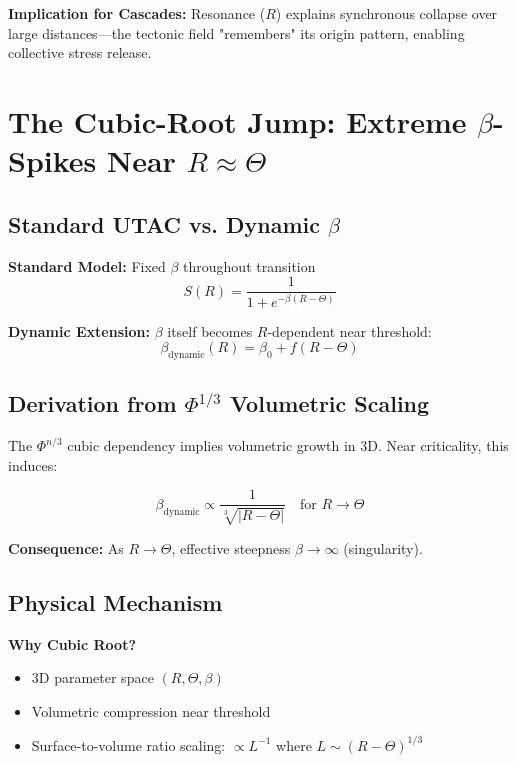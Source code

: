 \documentclass[11pt,a4paper]{article}
\begin{document}
\textbf{Implication for Cascades:} Resonance ($R$) explains synchronous collapse over large distances—the tectonic field "remembers" its origin pattern, enabling collective stress release.

\section{The Cubic-Root Jump: Extreme $\beta$-Spikes Near $R \approx \Theta$}

\subsection{Standard UTAC vs. Dynamic $\beta$}

\textbf{Standard Model:} Fixed $\beta$ throughout transition
\begin{equation}
S(R) = \frac{1}{1 + e^{-\beta(R - \Theta)}}
\end{equation}

\textbf{Dynamic Extension:} $\beta$ itself becomes $R$-dependent near threshold:
\begin{equation}
\beta_{\text{dynamic}}(R) = \beta_0 + f(R - \Theta)
\end{equation}

\subsection{Derivation from $\Phi^{1/3}$ Volumetric Scaling}

The $\Phi^{n/3}$ cubic dependency implies volumetric growth in 3D. Near criticality, this induces:

\begin{equation}
\beta_{\text{dynamic}} \propto \frac{1}{\sqrt[3]{|R - \Theta|}} \quad \text{for } R \to \Theta
\end{equation}

\textbf{Consequence:} As $R \to \Theta$, effective steepness $\beta \to \infty$ (singularity).

\subsection{Physical Mechanism}

\textbf{Why Cubic Root?}
\begin{itemize}
\item 3D parameter space $(R, \Theta, \beta)$
\item Volumetric compression near threshold
\item Surface-to-volume ratio scaling: $\propto L^{-1}$ where $L \sim (R-\Theta)^{1/3}$
\end{itemize}
\end{document}
